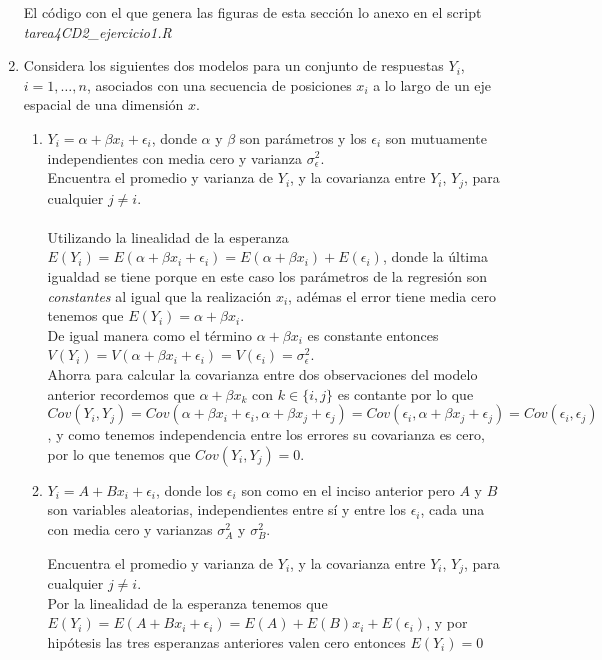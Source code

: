 \documentclass[paper=letter, fontsize=11pt]{scrartcl}
\numberwithin{equation}{section} %
\numberwithin{figure}{section} %
\numberwithin{table}{section} %
\begin{document}
\begin{enumerate}
El código con el que genera las figuras de esta sección lo anexo en el script \textit{tarea4CD2\_ejercicio1.R}
 
 
\item Considera los siguientes dos modelos para un conjunto de respuestas $Y_i$, $i=1,\ldots,n$, asociados con una secuencia de posiciones $x_i$ a lo largo de un eje espacial de una dimensión $x$.
  \begin{enumerate}
  \item $Y_i=\alpha+\beta x_i + \epsilon_i$, donde $\alpha$ y $\beta$ son parámetros y los $\epsilon_i$ son mutuamente independientes con media cero y varianza $\sigma^2_{\epsilon}$.\\
  
  Encuentra el promedio y varianza de $Y_i$, y la covarianza entre $Y_i$, $Y_j$, para cualquier $j\neq i$.\\\\
   Utilizando la linealidad de la esperanza $E(Y_i) = E(\alpha +\beta x_i + \epsilon_i)=E(\alpha+ \beta x_i) + E(\epsilon_i)$, donde la última igualdad se tiene porque en este caso los parámetros de la regresión son \textit{constantes} al igual que la realización $x_i$, adémas el error tiene media cero tenemos que $E(Y_i)= \alpha + \beta x_i$.\\
  De igual manera como el término $\alpha + \beta x_i$ es constante entonces $V(Y_i)=V(\alpha + \beta x_i + \epsilon_i)= V(\epsilon_i) = \sigma^2_\epsilon$.  \\
  Ahorra para calcular la covarianza entre dos observaciones del modelo anterior recordemos que $\alpha + \beta x_k$ con $ k\in \{i,j\}$ es contante por lo que $Cov(Y_i,Y_j)=Cov(\alpha +\beta x_i + \epsilon_i, \alpha +\beta x_j+ \epsilon_j) = Cov(\epsilon_i, \alpha + \beta x_j +\epsilon_j) = Cov(\epsilon_i, \epsilon_j)$, y como tenemos independencia entre los errores su covarianza es cero, por lo que tenemos que $Cov(Y_i,Y_j)=0$.\\
  

  \item $Y_i=A+Bx_i + \epsilon_i$, donde los $\epsilon_i$ son como en el inciso anterior pero $A$ y $B$ son variables aleatorias, independientes entre sí y entre los $\epsilon_i$, cada una con media cero y varianzas $\sigma^2_{A}$ y $\sigma^2_{B}$. 
  
    Encuentra el promedio y varianza de $Y_i$, y la covarianza entre $Y_i$, $Y_j$, para cualquier $j\neq i$.\\
 
Por la linealidad de la esperanza tenemos que $E(Y_i)=E(A+Bx_i + \epsilon_i)=E(A) + E(B)x_i +E(\epsilon_i)$, y por hipótesis las tres esperanzas anteriores valen cero entonces $E(Y_i)=0$
  

\end{enumerate}
\end{enumerate}
\end{document}
